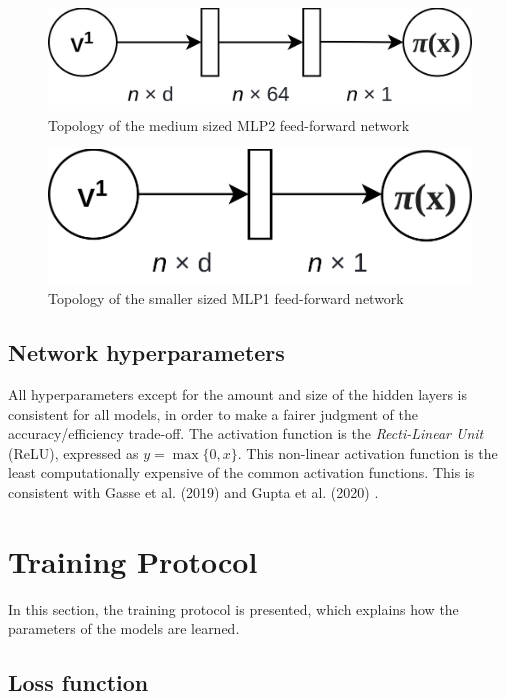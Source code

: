\begin{figure}
    \centering
    \includegraphics[width=0.6\linewidth]{img/mlp2.png}
    \caption{Topology of the medium sized MLP2 feed-forward network}
    \label{fig:topo_mlp2}
\end{figure}

\begin{figure}
    \centering
    \includegraphics[width=0.5\linewidth]{img/mlp1.png}
    \caption{Topology of the smaller sized MLP1 feed-forward network}
    \label{fig:topo_mlp1}
\end{figure}



\subsection{Network hyperparameters}

All hyperparameters except for the amount and size of the hidden layers is consistent for all models, in order to make a fairer judgment of the accuracy/efficiency trade-off. The activation function is the \textit{Recti-Linear Unit} (ReLU), expressed as $y = \max \{ 0, x\}$. This non-linear activation function is the least computationally expensive of the common activation functions. This is consistent with Gasse et al. (2019) \cite{gasse2019exact} and Gupta et al. (2020) \cite{gupta2020hybrid}.


\section{Training Protocol}\label{sec:trainingprotocol}

In this section, the training protocol is presented, which explains how the parameters of the models are learned.


\subsection{Loss function}

